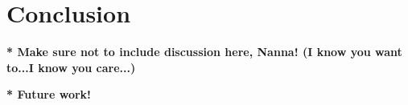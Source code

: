 \section{Conclusion}


\noindent\textbf{* Make sure not to include discussion here, Nanna! (I know you want to...I know you care...)}

\noindent\textbf{* Future work!}
